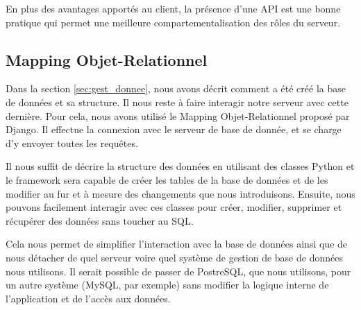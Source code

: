 \documentclass{EPL-master-thesis-covers-FR}
\begin{document}
				En plus des avantages apportés au client, la présence d'une API est une bonne pratique qui permet une meilleure compartementalisation des rôles du serveur.



			\subsection{Mapping Objet-Relationnel}

				Dans la section \ref{sec:gest_donnee}, nous avons décrit comment a été créé la base de données et sa structure. Il nous reste à faire interagir notre serveur avec cette dernière. Pour cela, nous avons utilisé le Mapping Objet-Relationnel proposé par Django. Il effectue la connexion avec le serveur de base de donnée, et se charge d'y envoyer toutes les requêtes.

				Il nous suffit de décrire la structure des données en utilisant des classes Python et le framework sera capable de créer les tables de la base de données et de les modifier au fur et à mesure des changements que nous introduisons. Ensuite, nous pouvons facilement interagir avec ces classes pour créer, modifier, supprimer et récupérer des données sans toucher au SQL.

				Cela nous permet de simplifier l'interaction avec la base de données ainsi que de nous détacher de quel serveur voire quel système de gestion de base de données nous utilisons. Il serait possible de passer de PostreSQL, que nous utilisons, pour un autre système (MySQL, par exemple) sans modifier la logique interne de l'application et de l'accès aux données.

\end{document}
